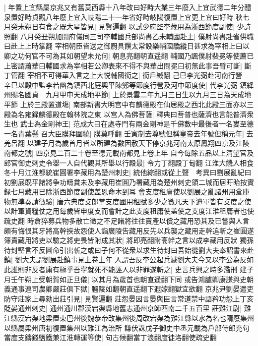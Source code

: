 |{
	年置上宜縣屬京兆又有舊莫西縣十八年改曰好畤大業三年廢入上宜武德二年分醴泉置好畤貞觀八年廢上宜入岐陽二十一年省好畤岐陽復置上宜更上宜曰好畤}
秋七月癸未朔日有食之既大星皆見|{
	見賢遍翻}
以試少府監李藏用為浙西節度副使|{
	少詩照翻}
八月癸丑朔加開府儀同三司李輔國兵部尚書乙未輔國赴上|{
	僕射尚書赴省供職曰赴上上時掌翻}
宰相朝臣皆送之御厨具饌太常設樂輔國驕縱日甚求為宰相上曰以卿之功何官不可為其如朝望未允何|{
	朝息亮翻朝直遥翻}
輔國乃諷僕射裴冕等使薦已上密謂蕭華曰輔國求為宰相若公卿表來不得不與華出問冕曰初無此事吾臂可斷|{
	斷丁管翻}
宰相不可得華入言之上大悦輔國銜之|{
	銜戶緘翻}
己巳李光弼赴河南行營　辛巳以殿中監李若幽為鎮西北庭興平陳鄭等節度行營及河中節度使|{
	代李光弼}
鎮絳州賜名國貞　九月甲申天成地平節|{
	上於景雲二年九月三日生以九月三日為天成地平節}
上於三殿置道塲|{
	南部新書大明宫中有麟德殿在仙居殿之西北此殿三面亦以三殿為名雍録麟德殿在翰林院之東}
以宫人為佛菩薩|{
	釋典曰菩普也薩濟也言能普濟衆生也}
武士為金剛神王|{
	范成大曰在處寺門有兩金剛神是千佛數中最後者一名婁至德一名青葉髻}
召大臣膜拜圍繞|{
	膜莫呼翻}
壬寅制去尊號但稱皇帝去年號但稱元年|{
	去羌呂翻}
以建子月為歲首月皆以所建為數因赦天下停京兆河南太原鳳翔四京及江陵南都之號|{
	四京見二百二十卷至德元載南都見上卷上年}
自今每除五品以上清望官及郎官御史刺史令舉一人自代觀其所舉以行殿最|{
	令力丁翻殿丁甸翻}
江淮大饑人相食　冬十月江淮都統崔圓署李藏用為楚州刺史|{
	統他綜翻或從上聲　考異曰劉展亂紀曰初劉展既平諸將争功疇賞未及李藏用崔圓乃署藏用為楚州刺史領二城而居盱眙按實録七月藏用已除浙西節度副使盖恩命木到耳}
會支度租庸使以劉展之亂諸州用倉庫物無準奏請徵驗|{
	唐六典度攴郎掌支度國用租賦多少之數凡天下邉軍皆有攴度之使以計軍資糧仗之用每歲皆申度攴而會計之此支度租庸使盖使之支度江淮租庸者也使疏史翻}
時倉猝募兵物多散亡徵之不足諸將往往賣產以償之藏用恐其及已嘗與人言頗有悔恨其牙將高幹挾故怨使人詣廣陵告藏用反先以兵襲之藏用走幹追斬之崔圓遂簿責藏用將吏以驗之將吏畏皆附成其狀|{
	將即亮翻附高幹之言以成李藏用反狀}
獨孫待封堅言不反圓命引出斬之或曰子何不從衆以求生待封曰吾始從劉大夫奉詔書來赴鎮|{
	劉大夫謂劉展赴鎮事見上卷上年}
人謂吾反李公起兵滅劉大夫今又以李公為反如此誰則非反者庸有極乎吾寜就死不能誣人以非罪遂斬之|{
	史言兵興之時多濫刑}
建子月壬午朔上受朝賀如正旦儀|{
	以其月為歲首也朝直遥翻下同}
或告鴻臚卿康謙與史朝義通事連司農卿嚴莊俱下獄|{
	臚陵如翻朝直遥翻下遐嫁翻獄宜欲翻}
京兆尹劉晏遣吏防守莊家上尋勑出莊引見|{
	見賢遍翻}
莊怨晏因言晏與臣言常道禁中語矜功怨上丁亥貶晏通州刺史|{
	通州通川郡漢宕渠縣地舊志通州京師西南二千五百里}
莊難江尉|{
	難江縣漢宕渠地梁置東巴州後魏恭帝改集州後周改宕渠為難江縣以水為名也隋廢集州以縣屬梁州唐初復置集州以難江為治所}
謙伏誅戊子御史中丞元載為戶部侍郎充句當度支鑄錢鹽鐵兼江淮轉運等使|{
	句古候翻當丁浪翻度徒洛翻使疏史翻}
